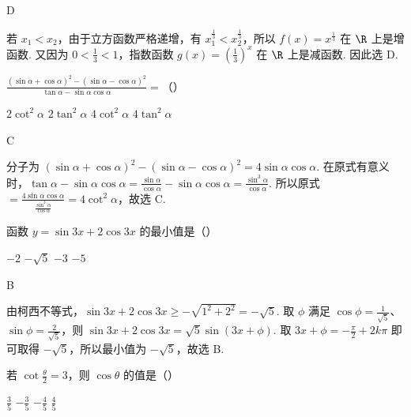 \begin{answer}D\end{answer}

\begin{solution}
若 \(x_{1}<x_{2}\)，由于立方函数严格递增，有 \(x_{1}^{\frac{1}{3}}<x_{2}^{\frac{1}{3}}\)，所以 \(f(x)=x^{\frac{1}{3}}\) 在 \(\R\) 上是增函数. 又因为 \(0<\frac13<1\)，指数函数 \(g(x)=\left(\frac13\right)^{x}\) 在 \(\R\) 上是减函数. 因此选 D.
\end{solution}

\begin{problem}
\(\displaystyle\frac{(\sin\alpha+\cos\alpha)^{2}-(\sin\alpha-\cos\alpha)^{2}}{\tan\alpha-\sin\alpha\cos\alpha}=\)（\quad）

\choices
{\(2\cot^{2}\alpha\)}
{\(2\tan^{2}\alpha\)}
{\(4\cot^{2}\alpha\)}
{\(4\tan^{2}\alpha\)}
\end{problem}

\begin{answer}C\end{answer}

\begin{solution}
分子为 \((\sin\alpha+\cos\alpha)^{2}-(\sin\alpha-\cos\alpha)^{2}=4\sin\alpha\cos\alpha\). 在原式有意义时，\(\tan\alpha-\sin\alpha\cos\alpha=\frac{\sin\alpha}{\cos\alpha}-\sin\alpha\cos\alpha=\frac{\sin^{3}\alpha}{\cos\alpha}\). 所以原式 \(=\frac{4\sin\alpha\cos\alpha}{\frac{\sin^{3}\alpha}{\cos\alpha}}=4\cot^{2}\alpha\)，故选 C.
\end{solution}

\begin{problem}
函数 \(y=\sin3x+2\cos3x\) 的最小值是（\quad）

\choices
{\(-2\)}
{\(-\sqrt5\)}
{\(-3\)}
{\(-5\)}
\end{problem}

\begin{answer}B\end{answer}

\begin{solution}
由柯西不等式，\(\sin3x+2\cos3x\geqslant-\sqrt{1^{2}+2^{2}}=-\sqrt5\). 取 \(\phi\) 满足 \(\cos\phi=\frac1{\sqrt5}\)、\(\sin\phi=\frac2{\sqrt5}\)，则
\(\sin3x+2\cos3x=\sqrt5\sin(3x+\phi)\). 取 \(3x+\phi=-\frac\pi2+2k\pi\) 即可取得 \(-\sqrt5\)，所以最小值为 \(-\sqrt5\)，故选 B.
\end{solution}

\begin{problem}
若 \(\cot\frac{\theta}{2}=3\)，则 \(\cos\theta\) 的值是（\quad）

\choices
{\(\frac35\)}
{\(-\frac35\)}
{\(-\frac45\)}
{\(\frac45\)}
\end{problem}

